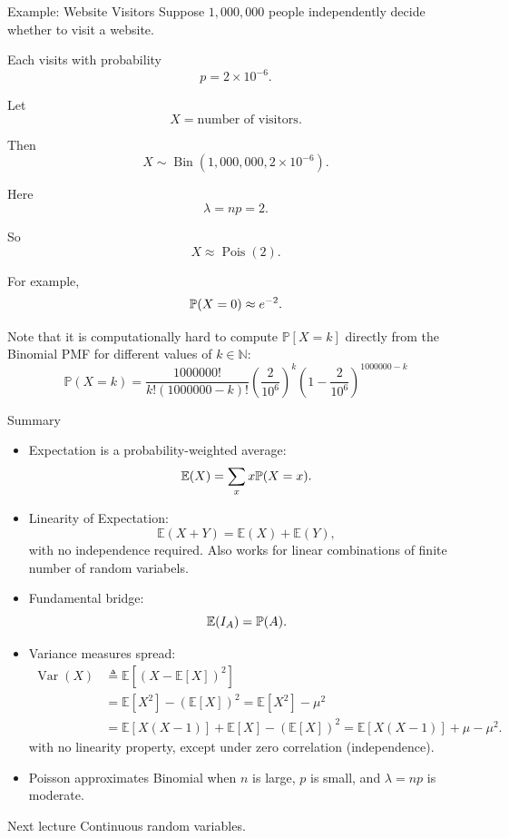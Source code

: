 \begin{frame}{Example: Website Visitors}
Suppose $1{,}000{,}000$ people independently decide whether to visit a website.

Each visits with probability
\[
p=2\times 10^{-6}.
\]

Let
\[
X=\text{number of visitors}.
\]

Then
\[
X\sim \operatorname{Bin}(1{,}000{,}000,2\times 10^{-6}).
\]

Here
\[
\lambda=np=2.
\]

So
\[
X\approx \operatorname{Pois}(2).
\]

For example,
\[
\mathbb{P}(X=0)\approx e^{-2}.
\]

Note that it is computationally hard to compute $\mathbb{P}[X=k]$ directly from the Binomial PMF for different values of $k\in \mathbb{N}$:
\begin{equation}
    \mathbb{P}(X=k) = \frac{1000000!}{k! (1000000-k)!} (\frac{2}{10^6})^k(1-\frac{2}{10^6})^{1000000-k}
\end{equation}
\end{frame}



\begin{frame}{Summary}
\begin{itemize}
    \item Expectation is a probability-weighted average:
    \[
    \mathbb{E}(X)=\sum_x x\mathbb{P}(X=x).
    \]

    \item Linearity of Expectation:
    \[
    \mathbb{E}(X+Y)=\mathbb{E}(X)+\mathbb{E}(Y),
    \]
    with no independence required. Also works for linear combinations of finite number of random variabels.

    \item Fundamental bridge:
    \[
    \mathbb{E}(I_A)=\mathbb{P}(A).
    \]

    \item Variance measures spread:
\[
\begin{aligned}
\operatorname{Var}(X)
&\triangleq \mathbb{E}\!\left[(X-\mathbb{E}[X])^2\right]\\
&= \mathbb{E}[X^2]-(\mathbb{E}[X])^2
= \mathbb{E}[X^2]-\mu^2 \\[0.3em]
&= \mathbb{E}[X(X-1)] + \mathbb{E}[X] - (\mathbb{E}[X])^2
= \mathbb{E}[X(X-1)] + \mu - \mu^2.
\end{aligned}
\]
with no linearity property, except under zero correlation (independence).

    \item Poisson approximates Binomial when $n$ is large, $p$ is small, and $\lambda=np$ is moderate.
\end{itemize}


\begin{keybox}{Next lecture}
Continuous random variables.
\end{keybox}
\end{frame}